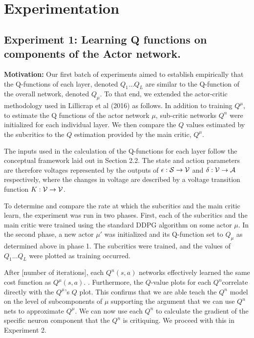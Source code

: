 \section{Experimentation}
\subsection{Experiment 1: Learning Q functions on components of the Actor network.}

\textbf{Motivation:}
Our first batch of experiments aimed to establish empirically that the Q-functions of each layer, denoted $Q_1...Q_L$ are similar to the Q-function of the overall network, denoted $Q_{\mu}$. To that end, we extended the actor-critic methodology used in Lillicrap et al (2016) as follows. In addition to training $Q^\mu$, to estimate the Q functions of the actor network $\mu$, sub-critic networks $Q^n$ were initialized for each individual layer. We then compare the $Q$ values estimated by the subcritics to the $Q$ estimation provided by the main critic, $Q^\mu$. 


The inputs used in the calculation of the Q-functions for each layer follow the conceptual framework laid out in Section 2.2. The state and action parameters are therefore voltages represented by the outputs of $\epsilon : {\mathcal S} \to {\mathcal V}$ and $\delta : {\mathcal V} \to {\mathcal A}$ respectively, where the changes in voltage are described by a voltage transition function $K : {\mathcal V} \to {\mathcal V}$. 


To determine and compare the rate at which the subcritics and the main critic learn, the experiment was run in two phases. First, each of the subcritics and the main critic were trained using the standard DDPG algorithm on some actor $\mu$. In the second phase, a new actor $\mu'$ was initialized and its Q-function set to $Q_{\mu}$ as determined above in phase 1. The subcritics were trained, and the values of $Q_1\dots Q_{L}$ were plotted as training occurred. 


After [number of iterations], each $Q^n(s,a)$  networks effectively learned the same cost function as $Q^{\mu}(s,a)$.
. Furthermore, the $Q$-value plots for each $Q^n$correlate directly with the  $Q^{\mu}$'s $Q$ plot. This confirms that we are able teach the $Q^n$ model on the level of subcomponents of $\mu$ supporting the argument that we can use $Q^n$ nets to approximate $Q^\mu$. We can now use each $Q^n$ to calculate the gradient of the specific neuron component that the $Q^n$ is critiquing. We proceed with this in Experiment 2.

